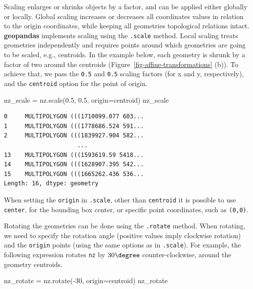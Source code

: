 \documentclass[
  letterpaper,
]{krantz}
\newenvironment{Shaded}{\begin{snugshade}}{\end{snugshade}}
\newcommand{\DecValTok}[1]{\textcolor[rgb]{0.68,0.00,0.00}{#1}}
\newcommand{\FloatTok}[1]{\textcolor[rgb]{0.68,0.00,0.00}{#1}}
\newcommand{\NormalTok}[1]{\textcolor[rgb]{0.00,0.23,0.31}{#1}}
\newcommand{\OperatorTok}[1]{\textcolor[rgb]{0.37,0.37,0.37}{#1}}
\newcommand{\StringTok}[1]{\textcolor[rgb]{0.13,0.47,0.30}{#1}}
\begin{document}
Scaling enlarges or shrinks objects by a factor, and can be applied
either globally or locally. Global scaling increases or decreases all
coordinates values in relation to the origin coordinates, while keeping
all geometries topological relations intact. \textbf{geopandas}
implements scaling using the \texttt{.scale} method. Local scaling
treats geometries independently and requires points around which
geometries are going to be scaled, e.g., centroids. In the example
below, each geometry is shrunk by a factor of two around the centroids
(Figure~\ref{fig-affine-transformations} (b)). To achieve that, we pass
the \texttt{0.5} and \texttt{0.5} scaling factors (for x and y,
respectively), and the
\texttt{\textquotesingle{}centroid\textquotesingle{}} option for the
point of origin.

\begin{Shaded}
\begin{Highlighting}[]
\NormalTok{nz\_scale }\OperatorTok{=}\NormalTok{ nz.scale(}\FloatTok{0.5}\NormalTok{, }\FloatTok{0.5}\NormalTok{, origin}\OperatorTok{=}\StringTok{\textquotesingle{}centroid\textquotesingle{}}\NormalTok{)}
\NormalTok{nz\_scale}
\end{Highlighting}
\end{Shaded}

\begin{verbatim}
0     MULTIPOLYGON (((1710099.077 603...
1     MULTIPOLYGON (((1778686.524 591...
2     MULTIPOLYGON (((1839927.904 582...
                     ...                
13    MULTIPOLYGON (((1593619.59 5418...
14    MULTIPOLYGON (((1628907.395 542...
15    MULTIPOLYGON (((1665262.436 536...
Length: 16, dtype: geometry
\end{verbatim}

When setting the \texttt{origin} in \texttt{.scale}, other than
\texttt{\textquotesingle{}centroid\textquotesingle{}} it is possible to
use \texttt{\textquotesingle{}center\textquotesingle{}}, for the
bounding box center, or specific point coordinates, such as
\texttt{(0,0)}.

Rotating the geometries can be done using the \texttt{.rotate} method.
When rotating, we need to specify the rotation angle (positive values
imply clockwise rotation) and the \texttt{origin} points (using the same
options as in \texttt{.scale}). For example, the following expression
rotates \texttt{nz} by \(30\degree\) counter-clockwise, around the
geometry centroids.

\begin{Shaded}
\begin{Highlighting}[]
\NormalTok{nz\_rotate }\OperatorTok{=}\NormalTok{ nz.rotate(}\OperatorTok{{-}}\DecValTok{30}\NormalTok{, origin}\OperatorTok{=}\StringTok{\textquotesingle{}centroid\textquotesingle{}}\NormalTok{)}
\NormalTok{nz\_rotate}
\end{Highlighting}
\end{Shaded}
\end{document}

